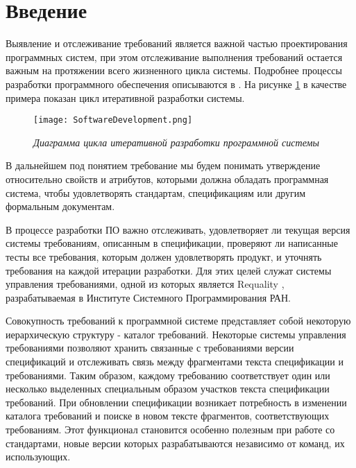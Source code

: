 \section{Введение}
\label{sec:Chapter1} 
Выявление и отслеживание требований является важной частью проектирования программных систем, при этом отслеживание выполнения требований остается важным на протяжении всего жизненного цикла системы. Подробнее процессы разработки программного обеспечения описываются в \cite{web:DevelopmentProcesses}. На рисунке \ref{intro:image1} в качестве примера показан цикл итеративной разработки системы.

\begin{figure}[h]
\begin{center}
\texttt{[image: SoftwareDevelopment.png]}
\caption{\emph{Диаграмма цикла итеративной разработки программной системы}}
\label{intro:image1}
\end{center}
\end{figure}

В дальнейшем под понятием требование мы будем понимать утверждение относительно свойств и атрибутов, которыми должна обладать программная система, чтобы удовлетворять стандартам, спецификациям или другим формальным документам. \cite{book:Requirements} \cite{book:SWEBOK}

В процессе разработки ПО важно отслеживать, удовлетворяет ли текущая версия системы требованиям, описанным в спецификации, проверяют ли написанные тесты все требования, которым должен удовлетворять продукт, и уточнять требования на каждой итерации разработки. Для этих целей служат системы управления требованиями, одной из которых является Requality \cite{web:Requality}, разрабатываемая в Институте Системного Программирования РАН.

Совокупность требований к программной системе представляет собой некоторую иерархическую структуру - каталог требований. Некоторые системы управления требованиями позволяют хранить связанные с требованиями версии спецификаций и отслеживать связь между фрагментами текста спецификации и требованиями. Таким образом, каждому требованию соответствует один или несколько выделенных специальным образом участков текста спецификации требований. При обновлении спецификации возникает потребность в изменении каталога требований и поиске в новом тексте фрагментов, соответствующих требованиям. Этот функционал становится особенно полезным при работе со стандартами, новые версии которых разрабатываются независимо от команд, их использующих.

